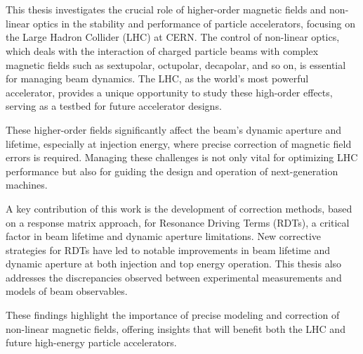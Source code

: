 \chapter{}


{
\fontsize{\fontsizeabstract}{\fontskipabstract}\selectfont

This thesis investigates the crucial role of higher-order magnetic fields and non-linear optics in
the stability and performance of particle accelerators, focusing on the Large Hadron Collider (LHC)
at CERN. The control of non-linear optics, which deals with the interaction of charged particle 
beams with complex magnetic fields such as sextupolar, octupolar, decapolar, and so on, is essential
for managing beam dynamics. The LHC, as the world's most powerful accelerator, provides a unique
opportunity to study these high-order effects, serving as a testbed for future accelerator designs.

These higher-order fields significantly affect the beam's dynamic aperture and lifetime, especially
at injection energy, where precise correction of magnetic field errors is required. Managing these
challenges is not only vital for optimizing LHC performance but also for guiding the design and
operation of next-generation machines.

A key contribution of this work is the development of correction methods, based on a response matrix
approach, for Resonance Driving Terms (RDTs), a critical factor in beam lifetime and dynamic
aperture limitations. New corrective strategies for RDTs have led to notable improvements in beam
lifetime and dynamic aperture at both injection and top energy operation. This thesis also addresses
the discrepancies observed between experimental measurements and models of beam observables.

These findings highlight the importance of precise modeling and correction of non-linear magnetic
fields, offering insights that will benefit both the LHC and future high-energy particle
accelerators.
}
